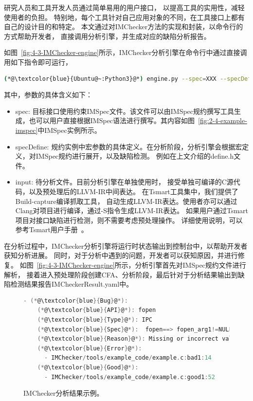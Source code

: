 研究人员和工具开发人员通过简单易用的用户接口，
以提高工具的实用性，减轻使用者的负担。
特别地，每个工具针对自己应用对象的不同，在工具接口上都有自己的设计目的和特定。
本文通过对IMChecker方法的实现和封装，以命令行的方式帮助开发者，
直接调用分析引擎，并生成对应的缺陷分析报告。

如图~\ref{fig:4-3-IMChecker-engine}所示，IMChecker分析引擎在命令行中通过直接调用如下指令即可运行，
\begin{lstlisting}[language={bash},
basicstyle=\linespread{0.8}\listingsfont,
numbers=none,
xleftmargin=.1\textwidth]
(*@\textcolor{blue}{Ubuntu@~:Python3}@*) engine.py --spec=XXX --specDefine=XXX --input=XXX
\end{lstlisting}
其中，参数的具体含义如下：
\begin{itemize}
	\item spec: 目标接口使用约束IMSpec文件。该文件可以由IMSpec规约撰写工具生成，也可以用户直接根据IMSpec语法进行撰写。其内容如图~\ref{fig:2-4-example-imspec}中IMSpec实例所示。
	\item specDefine: 规约实例中宏参数的具体定义。在分析阶段，分析引擎会根据宏定义，对IMSpec规约进行展开，以及缺陷检测。
	例如在上文介绍的define.h文件。
	\item input: 待分析文件。目前分析引擎在单独使用时，
	接受单独可编译的C源代码，以及预处理后的LLVM-IR中间表达。
	在Tsmart工具集中，我们提供了Build-capture编译抓取工具，
	自动生成LLVM-IR表达。使用者亦可以通过Clang对项目进行编译，通过-S指令生成LLVM-IR表达。
	如果用户通过Tsmart项目对接口缺陷进行检测，则不需要考虑预处理操作。
	详细使用说明，可以参考Tsmart用户手册~\cite{tsmart}。
\end{itemize}
在分析过程中，IMChecker分析引擎将运行时状态输出到控制台中，以帮助开发者获知分析进展。
同时，对于分析中遇到的问题，开发者可以获知原因，并进行修复。
如图~\ref{fig:4-3-IMChecker-engine}所示，分析引擎首先对IMSpec规约文件进行解析，
接着进入预处理阶段创建CFA、分析阶段，最后针对于分析结果输出到缺陷检测结果报告IMCheckerResult.yaml中。

\begin{figure}[t]
	\centering
	\begin{minipage}{0.7\linewidth}
\begin{lstlisting}[language={C},
basicstyle=\linespread{0.7}\listingsfont,
numbers=none,frame=trBL,
xleftmargin=0pt]
  - (*@\textcolor{blue}{Bug}@*):
    (*@\textcolor{blue}{API}@*): fopen
    (*@\textcolor{blue}{Type}@*): IPC
    (*@\textcolor{blue}{Spec}@*):  fopen==> fopen_arg1!=NULL
    (*@\textcolor{blue}{Reason}@*): Missing or incorrect validation of parameter
    (*@\textcolor{blue}{Error}@*): 
      - IMChecker/tools/example_code/example.c:bad1:14
    (*@\textcolor{blue}{Good}@*): 
      - IMChecker/tools/example_code/example.c:good1:52
\end{lstlisting}
	\end{minipage}
	\caption{
		IMChecker分析结果示例。
	}
	\label{fig:4-3-Result}
\end{figure}

